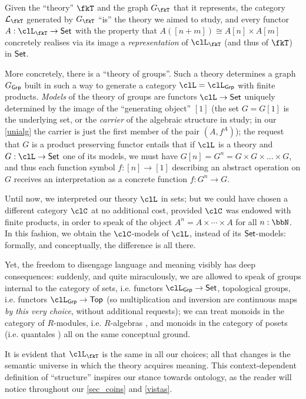 Given the ``theory'' $\fkT$ and the graph $G_{\fkT}$ that it represents, the category $\mathcal{L}_{\fkT}$ generated by $G_\fkT$ ``is'' the theory we aimed to study, and every functor $A: \clL_{\fkT} \to \Set$ with the property that $A([n+m]) \cong A[n] \times A[m]$ concretely realises via its image a \emph{representation} of $\clL_\fkT$ (and thus of $\fkT$) in $\mathsf{Set}$.
\begin{remark}\label{rmk_explicit_theoer}
	More concretely, there is a ``theory of groups''. Such a theory determines a graph $G_{\mathsf{Grp}}$ built in such a way to generate a category $\clL=\clL_{\cate{Grp}}$ with finite products. \emph{Models} of the theory of groups are functors $\clL \to \Set$ uniquely determined by the image of the ``generating object'' $[1]$ (the set $G=G[1]$ is the underlying set, or the \emph{carrier} of the algebraic structure in study; in our \autoref{unialg} the carrier is just the first member of the pair $(A,f^A)$); the request that $G$ is a product preserving functor entails that if $\clL$ is a theory and $G: \clL \to \Set$ one of its models, we must have $G[n]=G^n = G \times G \times\dots\times G$, and thus each function symbol $f: [n]\to [1]$ describing an abstract operation on $G$ receives an interpretation as a concrete function $f: G^n \to G$.
\end{remark}
Until now, we interpreted our theory $\clL$ in sets; but we could have chosen a different category $\clC$ at no additional cost, provided $\clC$ was endowed with finite products, in order to speak of the object $A^n = A\times \cdots\times A$ for all $n: \bbN$. In this fashion, we obtain the $\clC$-models of $\clL$, instead of its $\mathsf{Set}$-models: formally, and conceptually, the difference is all there.

Yet, the freedom to disengage language and meaning visibly has deep consequences: suddenly, and quite miraculously, we are allowed to speak of groups internal to the category of sets, i.e. functors $\clL_{\cate{Grp}} \to \Set$, topological groups, i.e. functors $\clL_{\cate{Grp}} \to \cate{Top}$ (so multiplication and inversion are continuous maps \emph{by this very choice}, without additional requests); we can treat monoids in the category of $R$-modules, i.e. $R$-algebras \cite[IV]{book337527}, and monoids in the category of posets (i.e. quantales \cite{Paseka2000}) all on the same conceptual ground.

It is evident that $\clL_{\fkT}$ is the same in all our choices; all that changes is the semantic universe in which the theory acquires meaning. This context-dependent definition of ``structure'' inspires our stance towards ontology, as the reader will notice throughout our \autoref{sec_coins} and \autoref{vistas}.

